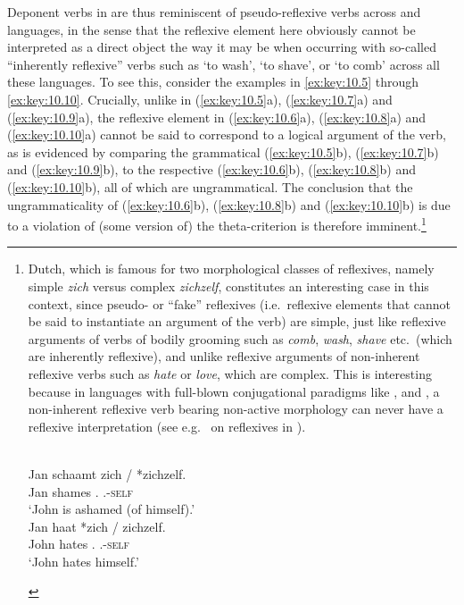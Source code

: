 \documentclass[output=paper]{langsci/langscibook}
\begin{document}
Deponent verbs in  are thus reminiscent of pseudo-reflexive verbs
across  and  languages, in the sense that the reflexive element
here obviously cannot be interpreted as a direct object the way it may be when
occurring with so-called “inherently reflexive” verbs such as ‘to wash’, ‘to
shave’, or ‘to comb’ across all these languages. To see this, consider the
examples in \eqref{ex:key:10.5} through \eqref{ex:key:10.10}. Crucially, unlike in
(\ref{ex:key:10.5}a), (\ref{ex:key:10.7}a) and (\ref{ex:key:10.9}a), the reflexive element in
(\ref{ex:key:10.6}a), (\ref{ex:key:10.8}a) and (\ref{ex:key:10.10}a) cannot be said to
correspond to a logical argument of the verb, as is evidenced by comparing the
grammatical (\ref{ex:key:10.5}b), (\ref{ex:key:10.7}b) and (\ref{ex:key:10.9}b), to the
respective (\ref{ex:key:10.6}b), (\ref{ex:key:10.8}b) and (\ref{ex:key:10.10}b), all of which
are ungrammatical. The conclusion that the ungrammaticality of (\ref{ex:key:10.6}b),
(\ref{ex:key:10.8}b) and (\ref{ex:key:10.10}b) is due to a violation of (some version of)
the theta-criterion is therefore imminent.\footnote{Dutch, which is famous for
two morphological classes of reflexives, namely simple \emph{zich} versus
complex \emph{zichzelf}, constitutes an interesting case in this context, since
pseudo- or \enquote{fake} reflexives (i.e.\ reflexive elements that cannot be
said to instantiate an argument of the verb) are simple, just like reflexive
arguments of verbs of bodily grooming such as \emph{comb}, \emph{wash},
\emph{shave} etc.\ (which are inherently reflexive), and unlike reflexive
arguments of non-inherent reflexive verbs such as \emph{hate} or \emph{love},
which are complex. This is interesting because in languages with full-blown
conjugational paradigms like ,  and , a non-inherent
reflexive verb bearing non-active morphology can never have a reflexive
interpretation (see e.g.\ \citealt{Embick1997,Embick:2004b} on reflexives in
).

\begin{exe}
     \\
    \gll    Jan schaamt zich / *zichzelf.\\
            Jan shames \Refl.\Third{} {} \hphantom{*}\Refl.\Third-\textsc{self}\\
    \glt    \enquote*{John is ashamed (of himself).}
     \\
    \gll    Jan haat *zich / zichzelf.\\
            John hates \llap{*}\Refl.\Third{} {} \Refl.\Third{}-\textsc{self}\\
    \glt    \enquote*{John hates himself.}
\end{exe}}
\end{document}
